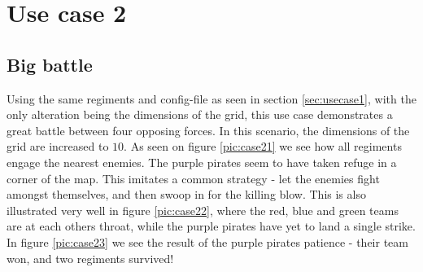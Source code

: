 \section{Use case 2}
	\subsection*{Big battle}
	Using the same regiments and config-file as seen in section \ref{sec:usecase1}, with the only alteration being the dimensions of the grid, this use case demonstrates a great battle between four opposing forces. In this scenario, the dimensions of the grid are increased to $10$. As seen on figure \ref{pic:case21} we see how all regiments engage the nearest enemies. The purple pirates seem to have taken refuge in a corner of the map. This imitates a common strategy - let the enemies fight amongst themselves, and then swoop in for the killing blow. This is also illustrated very well in figure \ref{pic:case22}, where the red, blue and green teams are at each others throat, while the purple pirates have yet to land a single strike. In figure \ref{pic:case23} we see the result of the purple pirates patience - their team won, and two regiments survived!
	
